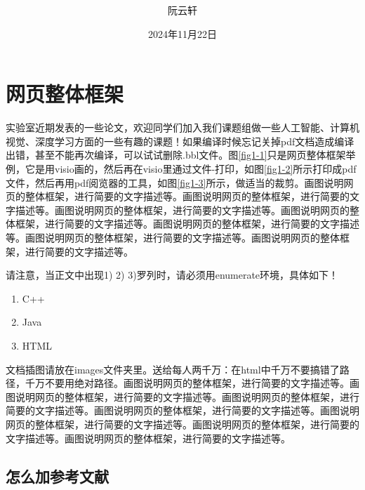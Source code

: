 \documentclass[supercite]{Experimental_Report}
\title{~~~~~~~~~~~~}
\author{阮云轩}
\date{2024年11月22日}
\theoremstyle{definition}
\begin{document}
	
	\maketitle
	
	\clearpage
	
	
	\tableofcontents[level=2]
	
	\clearpage
	
	
	\section{网页整体框架}
	
	实验室近期发表的一些论文\cite{Li2022AAAI, Chen2021MMA, Chen2022IMC, Ren2021JVCI, Ren2022MTAP}，欢迎同学们加入我们课题组做一些人工智能、计算机视觉、深度学习方面的一些有趣的课题！如果编译时候忘记关掉pdf文档造成编译出错，甚至不能再次编译，可以试试删除.bbl文件。图\ref{fig1-1}只是网页整体框架举例，它是用visio画的，然后再在visio里通过文件-打印，如图\ref{fig1-2}所示打印成pdf文件，然后再用pdf阅览器的工具，如图\ref{fig1-3}所示，做适当的裁剪。画图说明网页的整体框架，进行简要的文字描述等。画图说明网页的整体框架，进行简要的文字描述等。画图说明网页的整体框架，进行简要的文字描述等。画图说明网页的整体框架，进行简要的文字描述等。画图说明网页的整体框架，进行简要的文字描述等。画图说明网页的整体框架，进行简要的文字描述等。画图说明网页的整体框架，进行简要的文字描述等。
	
	请注意，当正文中出现1) 2) 3)罗列时，请必须用enumerate环境，具体如下！
	
	\begin{enumerate}
		\renewcommand{\labelenumi}{\theenumi)}
		\item C++
		\item Java
		\item HTML
	\end{enumerate}
	
	文档插图请放在images文件夹里。送给每人两千万：在html中千万不要搞错了路径，千万不要用绝对路径。画图说明网页的整体框架，进行简要的文字描述等。画图说明网页的整体框架，进行简要的文字描述等。画图说明网页的整体框架，进行简要的文字描述等。画图说明网页的整体框架，进行简要的文字描述等。画图说明网页的整体框架，进行简要的文字描述等。画图说明网页的整体框架，进行简要的文字描述等。画图说明网页的整体框架，进行简要的文字描述等。
	
	\subsection{怎么加参考文献}
	
\end{document}
